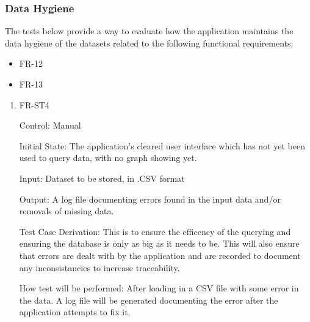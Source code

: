 \documentclass[12pt, titlepage]{article}
\begin{document}
      \subsubsection{Data Hygiene}
      The tests below provide a way to evaluate how the application maintains the data hygiene of the datasets related to the following functional requirements:
      \begin{itemize}
        \item FR-12
        \item FR-13
      \end{itemize}
        \begin{enumerate}
        
          \item{FR-ST4}
          
          Control: Manual
                    
          Initial State: The application's cleared user interface which has not yet been used to query data, with no graph showing yet.
                    
          Input: Dataset to be stored, in .CSV format
                    
          Output: A log file documenting errors found in the input data and/or removals of missing data.
          
          Test Case Derivation: This is to ensure the efficency of the querying and ensuring the database is only as big as it needs to be. This will also ensure that errors are dealt with by the application and are recorded to document any inconsistancies to increase traceability.
                    
          How test will be performed: After loading in a CSV file with some error in the data. A log file will be generated documenting the error after the application attempts to fix it. 
          
          \end{enumerate}
\end{document}
